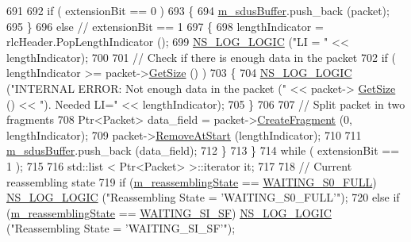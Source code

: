 \begin{DoxyCode}
691 
692       \textcolor{keywordflow}{if} ( extensionBit == 0 )
693         \{
694           \hyperlink{classns3_1_1LteRlcUmLowLat_af48f3f6deda08898aac5c30d9926a798}{m\_sdusBuffer}.push\_back (packet);
695         \}
696       \textcolor{keywordflow}{else} \textcolor{comment}{// extensionBit == 1}
697         \{
698           lengthIndicator = rlcHeader.PopLengthIndicator ();
699           \hyperlink{group__logging_ga88acd260151caf2db9c0fc84997f45ce}{NS\_LOG\_LOGIC} (\textcolor{stringliteral}{"LI = "} << lengthIndicator);
700 
701           \textcolor{comment}{// Check if there is enough data in the packet}
702           \textcolor{keywordflow}{if} ( lengthIndicator >= packet->\hyperlink{classns3_1_1Packet_a462855c9929954d4301a4edfe55f4f1c}{GetSize} () )
703             \{
704               \hyperlink{group__logging_ga88acd260151caf2db9c0fc84997f45ce}{NS\_LOG\_LOGIC} (\textcolor{stringliteral}{"INTERNAL ERROR: Not enough data in the packet ("} << packet->
      \hyperlink{classns3_1_1Packet_a462855c9929954d4301a4edfe55f4f1c}{GetSize} () << \textcolor{stringliteral}{"). Needed LI="} << lengthIndicator);
705             \}
706 
707           \textcolor{comment}{// Split packet in two fragments}
708           Ptr<Packet> data\_field = packet->\hyperlink{classns3_1_1Packet_a16f6113606b355b2b346e2245fa2a3d0}{CreateFragment} (0, lengthIndicator);
709           packet->\hyperlink{classns3_1_1Packet_a78aa207e7921dd2f9f7e0d0b7a1c730a}{RemoveAtStart} (lengthIndicator);
710 
711           \hyperlink{classns3_1_1LteRlcUmLowLat_af48f3f6deda08898aac5c30d9926a798}{m\_sdusBuffer}.push\_back (data\_field);
712         \}
713     \}
714   \textcolor{keywordflow}{while} ( extensionBit == 1 );
715 
716   std::list < Ptr<Packet> >::iterator it;
717 
718   \textcolor{comment}{// Current reassembling state}
719   \textcolor{keywordflow}{if}      (\hyperlink{classns3_1_1LteRlcUmLowLat_a5e5269ecafdea7712cd6f6a3a2535e32}{m\_reassemblingState} == \hyperlink{classns3_1_1LteRlcUmLowLat_a0681446b7b6191c38dbf0fc526a917bfafdaebb39f979eb77f3d0af57f310a880}{WAITING\_S0\_FULL})  
      \hyperlink{group__logging_ga88acd260151caf2db9c0fc84997f45ce}{NS\_LOG\_LOGIC} (\textcolor{stringliteral}{"Reassembling State = 'WAITING\_S0\_FULL'"});
720   \textcolor{keywordflow}{else} \textcolor{keywordflow}{if} (\hyperlink{classns3_1_1LteRlcUmLowLat_a5e5269ecafdea7712cd6f6a3a2535e32}{m\_reassemblingState} == \hyperlink{classns3_1_1LteRlcUmLowLat_a0681446b7b6191c38dbf0fc526a917bfabc4f80a5f494c7e12558de2811e23a2d}{WAITING\_SI\_SF})    
      \hyperlink{group__logging_ga88acd260151caf2db9c0fc84997f45ce}{NS\_LOG\_LOGIC} (\textcolor{stringliteral}{"Reassembling State = 'WAITING\_SI\_SF'"});

\end{DoxyCode}
